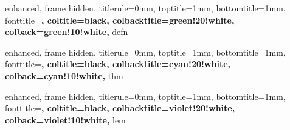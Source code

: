 

{
    enhanced,
    frame hidden,
    titlerule=0mm,
    toptitle=1mm,
    bottomtitle=1mm,
    fonttitle=\bfseries\large,
    coltitle=black,
    colbacktitle=green!20!white,
    colback=green!10!white,
}{defn}





{
    enhanced,
    frame hidden,
    titlerule=0mm,
    toptitle=1mm,
    bottomtitle=1mm,
    fonttitle=\bfseries\large,
    coltitle=black,
    colbacktitle=cyan!20!white,
    colback=cyan!10!white,
}{thm}



{
    enhanced,
    frame hidden,
    titlerule=0mm,
    toptitle=1mm,
    bottomtitle=1mm,
    fonttitle=\bfseries\large,
    coltitle=black,
    colbacktitle=violet!20!white,
    colback=violet!10!white,
}{lem}


